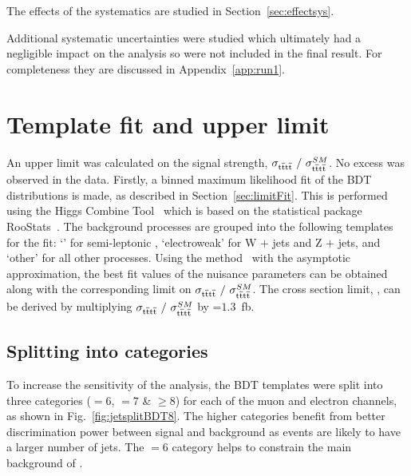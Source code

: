 
The effects of the systematics are studied in Section~\ref{sec:effectsys}.

Additional systematic uncertainties were studied which ultimately had a negligible impact on the analysis so were not included in the final result. For completeness they are discussed in Appendix~\ref{app:run1}.

\section{Template fit and upper limit}
\label{sec:limit}

An upper limit was calculated on the signal strength, $\sigma_{{\mathrm{t}\overline{\mathrm{t}}\mathrm{t}\overline{\mathrm{t}}}}~/~\sigma_{{\mathrm{t}\overline{\mathrm{t}}\mathrm{t}\overline{\mathrm{t}}}}^{SM} $. No excess was observed in the data. Firstly, a binned maximum likelihood fit of the BDT distributions is made, as described in Section~\ref{sec:limitFit}. This is performed using the Higgs Combine Tool~\cite{CMS-NOTE-2011-005} which is based on the statistical package RooStats~\cite{RooStats:2010,Read:2002hq,Junk:1999kv,Cowan:2011js}. 
The background processes are grouped into the following templates for the fit: `\ttbar' for semi-leptonic \ttbar, `electroweak' for W $+$ jets and Z $+$ jets, and `\ttbar\textunderscore other' for all other \ttbar processes. Using the \CLS method~\cite{Junk1999435,0954-3899-28-10-313} with the asymptotic approximation, the best fit values of the nuisance parameters can be obtained along with the corresponding limit on $\sigma_{{\mathrm{t}\overline{\mathrm{t}}\mathrm{t}\overline{\mathrm{t}}}}~/~\sigma_{{\mathrm{t}\overline{\mathrm{t}}\mathrm{t}\overline{\mathrm{t}}}}^{SM} $. The cross section limit, \sigmatttt, can be derived by multiplying $\sigma_{{\mathrm{t}\overline{\mathrm{t}}\mathrm{t}\overline{\mathrm{t}}}}~/~\sigma_{{\mathrm{t}\overline{\mathrm{t}}\mathrm{t}\overline{\mathrm{t}}}}^{SM} $ by \sigmattttSM=$1.3$~fb.

\subsection{Splitting into \njets categories}
\label{sec:njetcatlimit}
To increase the sensitivity of the analysis, the BDT templates were split into three \njets categories (\njets $= 6$, \njets $= 7 $ \& \njets $\geq 8$) for each of the muon and electron channels, as shown in Fig.~\ref{fig:jetsplitBDT8}. The higher \njets categories benefit from better discrimination power between signal and background as \tttt events are likely to have a larger number of jets. The \njets $= 6$ category helps to constrain the main background of \ttbar. 


